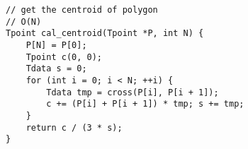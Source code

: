 \begin{verbatim}
// get the centroid of polygon
// O(N)
Tpoint cal_centroid(Tpoint *P, int N) {
    P[N] = P[0];
    Tpoint c(0, 0);
    Tdata s = 0;
    for (int i = 0; i < N; ++i) {
        Tdata tmp = cross(P[i], P[i + 1]);
        c += (P[i] + P[i + 1]) * tmp; s += tmp;
    }
    return c / (3 * s);
}
\end{verbatim}
